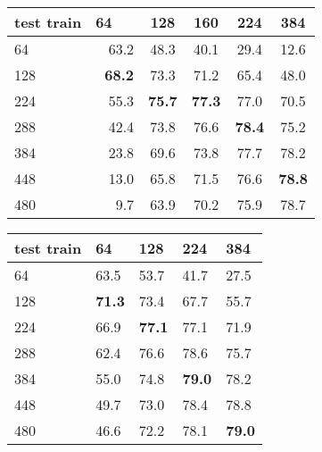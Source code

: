 \begin{table*}


{\small ~\hfill \begin{tabular}{lrcccc}
    \toprule
    test  train     & 64 \ \ & 128 & 160 & 224 & 384 \\
    \midrule
    64 & 63.2 & 48.3 & 40.1 & 29.4 & 12.6 \\
    128 & \textbf{68.2} & 73.3 &71.2 & 65.4 & 48.0 \\
    224 & 55.3 & \textbf{75.7} &\textbf{ 77.3}  & 77.0 & 70.5 \\
    288 & 42.4 & 73.8 & 76.6 & \textbf{78.4} & 75.2 \\
    384 & 23.8 & 69.6 & 73.8 & 77.7 & 78.2 \\
    448 & 13.0 & 65.8 &71.5 & 76.6 & \textbf{78.8} \\
    480 & 9.7 & 63.9 & 70.2 & 75.9 & 78.7 \\
    \bottomrule
  \end{tabular}\hfill
  \begin{tabular}{l|llll}
    \toprule
    test  train     & 64 & 128 & 224 & 384 \\
    \midrule
    64 & 63.5  & 53.7  & 41.7 & 27.5 \\
    128 & \textbf{71.3} & 73.4 & 67.7 & 55.7 \\
    224 & 66.9 & \textbf{77.1}  & 77.1 & 71.9 \\
    288 & 62.4 & 76.6 & 78.6 & 75.7 \\
    384 & 55.0 & 74.8 & \textbf{79.0} & 78.2 \\
    448 & 49.7 & 73.0 & 78.4 & 78.8 \\
    480 & 46.6 & 72.2 & 78.1 & \textbf{79.0} \\
    \bottomrule
\end{tabular} \hfill ~}
\smallskip
    \caption{
    \label{tab:baselines}
	Top-1 validation accuracy for different combinations of training and testing resolution. 
	Left: with the standard training procedure, (no finetuning, no adaptation of the ResNet-50).
	Right: with our data-driven adaptation strategy and test-time augmentations.
}
\end{table*}

